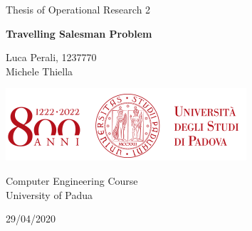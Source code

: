 \documentclass[10pt,swedish, openany]{book}
\begin{document}

	\begin{titlepage}
		\clearpage\thispagestyle{empty}
		\centering
		\vspace{2cm}

		{\large Thesis of Operational Research 2 \par}
		\vspace{4cm}
		{\Huge \textbf{Travelling Salesman Problem}} \\
		\vspace{4cm}
		{\normalsize Luca Perali, 1237770  \\
			Michele Thiella  \par}
		\vspace{2cm}

		\includegraphics[scale=0.75]{uniLogo.png}

		\vspace{2cm}

		{\normalsize Computer Engineering Course \\
			University of Padua \par}

		{\normalsize 29/04/2020 \par}
		\vspace{2cm}

		\pagebreak

	\end{titlepage}

	\tableofcontents{}

	\clearpage


	\mainmatter

	

	


	
	


	
\end{document}
